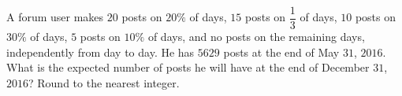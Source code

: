 A forum user makes $20$ posts on $20\%$ of days, $15$ posts on $\dfrac{1}{3}$ of days, $10$ posts on $30\%$ of days, $5$ posts on $10\%$ of days, and no posts on the remaining days, independently from day to day. He has $5629$ posts at the end of May $31$, $2016$. What is the expected number of posts he will have at the end of December $31$, $2016$? Round to the nearest integer.
